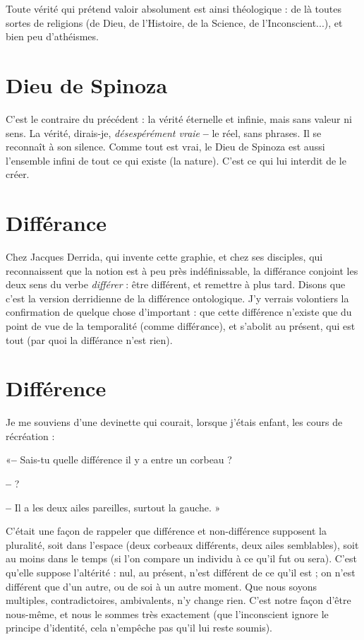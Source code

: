Toute vérité qui prétend valoir absolument est ainsi théologique : de là
toutes sortes de religions (de Dieu, de l'Histoire, de la Science, de l’Inconscient...),
et bien peu d’athéismes.

\section{Dieu de Spinoza}
C'est le contraire du précédent : la vérité éternelle et
infinie, mais sans valeur ni sens. La vérité, dirais-je,
{\it désespérément vraie} {\bf --} le réel, sans phrases. Il se reconnaît à son silence.
Comme tout est vrai, le Dieu de Spinoza est aussi l’ensemble infini de tout
ce qui existe (la nature). C’est ce qui lui interdit de le créer.

\section{Différance}
Chez Jacques Derrida, qui invente cette graphie, et chez ses
disciples, qui reconnaissent que la notion est à peu près
indéfinissable, la différance conjoint les deux sens du verbe {\it différer} : être différent,
et remettre à plus tard. Disons que c’est la version derridienne de la différence
ontologique. J’y verrais volontiers la confirmation de quelque chose
d’important : que cette différence n’existe que du point de vue de la temporalité
(comme différ{\it a}nce), et s’abolit au présent, qui est tout (par quoi la différance
n’est rien).

\section{Différence}
Je me souviens d’une devinette qui courait, lorsque j'étais
enfant, les cours de récréation :

«{\bf --} Sais-tu quelle différence il y a entre un corbeau ?

{\bf --} ?

{\bf --} Il a les deux ailes pareilles, surtout la gauche. »

C'était une façon de rappeler que différence et non-différence supposent la
pluralité, soit dans l’espace (deux corbeaux différents, deux ailes semblables),
soit au moins dans le temps (si l’on compare un individu à ce qu’il fut ou sera).
C’est qu’elle suppose l’altérité : nul, au présent, n’est différent de ce qu’il est ;
on n’est différent que d’un autre, ou de soi à un autre moment. Que nous
soyons multiples, contradictoires, ambivalents, n’y change rien. C’est notre
façon d’être nous-même, et nous le sommes très exactement (que l’inconscient
ignore le principe d’identité, cela n’empêche pas qu’il lui reste soumis).

